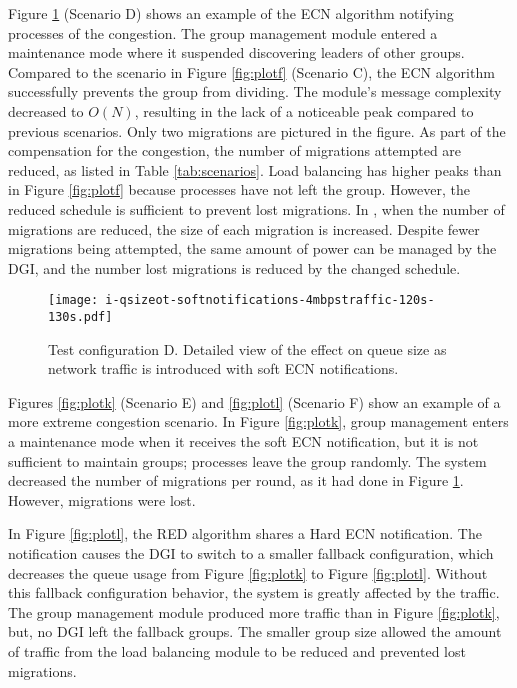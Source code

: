 
Figure \ref{fig:ploti} (Scenario D) shows an example of the \ac{ECN} algorithm notifying processes of the congestion.
The group management module entered a maintenance mode where it suspended discovering leaders of other groups.
Compared to the scenario in Figure \ref{fig:plotf} (Scenario C), the \ac{ECN} algorithm successfully prevents the group from dividing.
The module's message complexity decreased to $O(N)$, resulting in the lack of a noticeable peak compared to previous scenarios.
Only two migrations are pictured in the figure.
As part of the compensation for the congestion, the number of migrations attempted are reduced, as listed in Table \ref{tab:scenarios}.
Load balancing has higher peaks than in Figure \ref{fig:plotf} because processes have not left the group.
However, the reduced schedule is sufficient to prevent lost migrations.
In \cite{ecn-cloudhari}, when the number of migrations are reduced, the size of each migration is increased.
Despite fewer migrations being attempted, the same amount of power can be managed by the \ac{DGI}, and the number lost migrations is reduced by the changed schedule.

\begin{figure}[htbp]
\centering
\texttt{[image: i-qsizeot-softnotifications-4mbpstraffic-120s-130s.pdf]}
\caption{
    Test configuration D.
Detailed view of the effect on queue size as network traffic is introduced with soft \ac{ECN} notifications.
}
\label{fig:ploti}
\end{figure}

Figures \ref{fig:plotk} (Scenario E) and \ref{fig:plotl} (Scenario F) show an example of a more extreme congestion scenario.
In Figure \ref{fig:plotk}, group management enters a maintenance mode when it receives the soft \ac{ECN} notification, but it is not sufficient to maintain groups; processes leave the group randomly.
The system decreased the number of migrations per round, as it had done in Figure \ref{fig:ploti}.
However, migrations were lost.

In Figure \ref{fig:plotl}, the \ac{RED} algorithm shares a Hard \ac{ECN} notification.
The notification causes the \ac{DGI} to switch to a smaller fallback configuration, which decreases the queue usage from Figure \ref{fig:plotk} to Figure \ref{fig:plotl}.
Without this fallback configuration behavior, the system is greatly affected by the traffic.
The group management module produced more traffic than in Figure \ref{fig:plotk}, but, no DGI left the fallback groups.
The smaller group size allowed the amount of traffic from the load balancing module to be reduced and prevented lost migrations.

